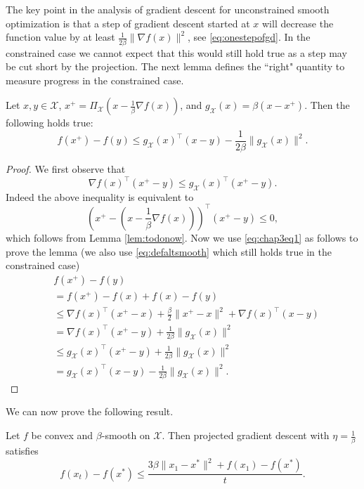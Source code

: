 \documentclass[openany]{now}
\newcommand{\cX}{\mathcal{X}}
\begin{document}
The key point in the analysis of gradient descent for unconstrained smooth optimization is that a step of gradient descent started at $x$ will decrease the function value by at least $\frac{1}{2\beta} \|\nabla f(x)\|^2$, see \eqref{eq:onestepofgd}. In the constrained case we cannot expect that this would still hold true as a step may be cut short by the projection. The next lemma defines the ``right" quantity to measure progress in the constrained case.

\begin{lemma} \label{lem:smoothconst}
Let $x, y \in \cX$, $x^+ = \Pi_{\cX}\left(x - \frac{1}{\beta} \nabla f(x)\right)$, and $g_{\cX}(x) = \beta(x - x^+)$. Then the following holds true:
$$f(x^+) - f(y) \leq g_{\cX}(x)^{\top}(x-y) - \frac{1}{2 \beta} \|g_{\cX}(x)\|^2 .$$
\end{lemma}

\begin{proof}
We first observe that 
\begin{equation} \label{eq:chap3eq1}
\nabla f(x)^{\top} (x^+ - y) \leq g_{\cX}(x)^{\top}(x^+ - y) .
\end{equation}
Indeed the above inequality is equivalent to
$$\left(x^+- \left(x - \frac{1}{\beta} \nabla f(x) \right)\right)^{\top} (x^+ - y) \leq 0, $$
which follows from Lemma \ref{lem:todonow}. Now we use \eqref{eq:chap3eq1} as follows to prove the lemma (we also use \eqref{eq:defaltsmooth} which still holds true in the constrained case)
\begin{align*}
& f(x^+) - f(y) \\
& = f(x^+) - f(x) + f(x) - f(y) \\
& \leq \nabla f(x)^{\top} (x^+-x) + \frac{\beta}{2} \|x^+-x\|^2 + \nabla f(x)^{\top} (x-y) \\
& = \nabla f(x)^{\top} (x^+ - y) + \frac{1}{2 \beta} \|g_{\cX}(x)\|^2 \\
& \leq g_{\cX}(x)^{\top}(x^+ - y) + \frac{1}{2 \beta} \|g_{\cX}(x)\|^2 \\
& = g_{\cX}(x)^{\top}(x - y) - \frac{1}{2 \beta} \|g_{\cX}(x)\|^2 .
\end{align*}
\end{proof}
We can now prove the following result.
\begin{theorem} \label{th:gdsmoothconstrained}
Let $f$ be convex and $\beta$-smooth on $\cX$. Then projected gradient descent with $\eta = \frac{1}{\beta}$ satisfies
$$f(x_t) - f(x^*) \leq \frac{3 \beta \|x_1 - x^*\|^2 + f(x_1) - f(x^*)}{t} .$$
\end{theorem}
\end{document}
